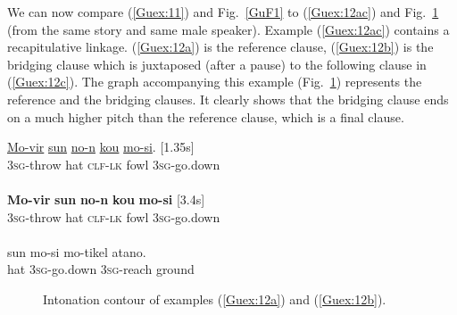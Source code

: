 \documentclass[output=paper]{LSP/langsci}
\begin{document}
We can now compare (\ref{Guex:11}) and Fig.~\ref{GuF1} to (\ref{Guex:12ac}) and Fig.~\ref{GuF2} (from the same story and same male speaker). Example (\ref{Guex:12ac}) contains a recapitulative linkage. (\ref{Guex:12a}) is the reference clause, (\ref{Guex:12b}) is the bridging clause which is juxtaposed (after a pause) to the following clause in (\ref{Guex:12c}). The graph accompanying this example (Fig.~\ref{GuF2}) represents the reference and the bridging clauses. It clearly shows that the bridging clause ends on a much higher pitch than the reference clause, which is a final clause.


\begin{exe}
\ex \label{Guex:12ac}
\begin{xlist}
\ex \label{Guex:12a}
\gll \underline{Mo-vir}        \underline{sun}   \underline{no-n}          \underline{kou}   \underline{mo-si}. [1.35s]\\
\textsc{3sg}-throw   hat   \textsc{clf-lk}   fowl   \textsc{3sg}-go.down \\
\glt {}\\
\ex \label{Guex:12b}
\gll \textbf{Mo-vir}      \textbf{sun}    \textbf{no-n}           \textbf{kou}    \textbf{mo-si} [3.4s] \\
\textsc{3sg}-throw   hat   \textsc{clf-lk}   fowl   \textsc{3sg}-go.down\\
\glt {}\\
\ex \label{Guex:12c}
\gll sun    mo-si          mo-tikel        atano.\\     	       
hat    \textsc{3sg}-go.down   \textsc{3sg}-reach     ground\\
\glt {} 
\end{xlist}
\end{exe}

\begin{figure}[ht]
\caption{Intonation contour of examples (\ref{Guex:12a}) and (\ref{Guex:12b}). \label{GuF2}}
\end{figure}
\end{document}
